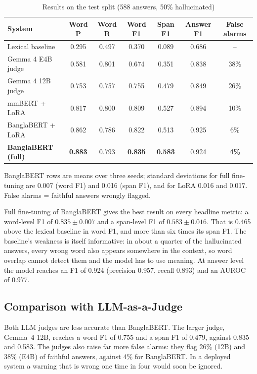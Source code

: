 \begin{table}[htbp]
\centering
\small
\caption{Results on the test split (588 answers, 50\% hallucinated)}
\label{tab:main}
\begin{tabular}{lcccccc}
\hline
\textbf{System} & \textbf{Word P} & \textbf{Word R} & \textbf{Word F1} & \textbf{Span F1} & \textbf{Answer F1} & \textbf{False alarms} \\
\hline
Lexical baseline & 0.295 & 0.497 & 0.370 & 0.089 & 0.686 & -- \\
Gemma 4 E4B judge & 0.581 & 0.801 & 0.674 & 0.351 & 0.838 & 38\% \\
Gemma 4 12B judge & 0.753 & 0.757 & 0.755 & 0.479 & 0.849 & 26\% \\
mmBERT + LoRA & 0.817 & 0.800 & 0.809 & 0.527 & 0.894 & 10\% \\
BanglaBERT + LoRA & 0.862 & 0.786 & 0.822 & 0.513 & 0.925 & 6\% \\
\textbf{BanglaBERT (full)} & \textbf{0.883} & 0.793 & \textbf{0.835} & \textbf{0.583} & 0.924 & \textbf{4\%} \\
\hline
\end{tabular}

\smallskip
\footnotesize BanglaBERT rows are means over three seeds; standard deviations
for full fine-tuning are 0.007 (word F1) and 0.016 (span F1), and for LoRA
0.016 and 0.017. False alarms = faithful answers wrongly flagged.
\end{table}

Full fine-tuning of BanglaBERT gives the best result on every headline metric:
a word-level F1 of $0.835 \pm 0.007$ and a span-level F1 of $0.583 \pm 0.016$.
That is 0.465 above the lexical baseline in word F1, and more than six times
its span F1. The baseline's weakness is itself informative: in about a quarter
of the hallucinated answers, every wrong word also appears somewhere in the
context, so word overlap cannot detect them and the model has to use meaning.
At answer level the model reaches an F1 of 0.924 (precision 0.957, recall
0.893) and an AUROC of 0.977.

\subsection{Comparison with LLM-as-a-Judge}

Both LLM judges are less accurate than BanglaBERT. The larger judge, Gemma~4
12B, reaches a word F1 of 0.755 and a span F1 of 0.479, against 0.835 and 0.583.
The judges also raise far more false alarms: they flag 26\% (12B) and 38\% (E4B)
of faithful answers, against 4\% for BanglaBERT. In a deployed system a warning
that is wrong one time in four would soon be ignored.

